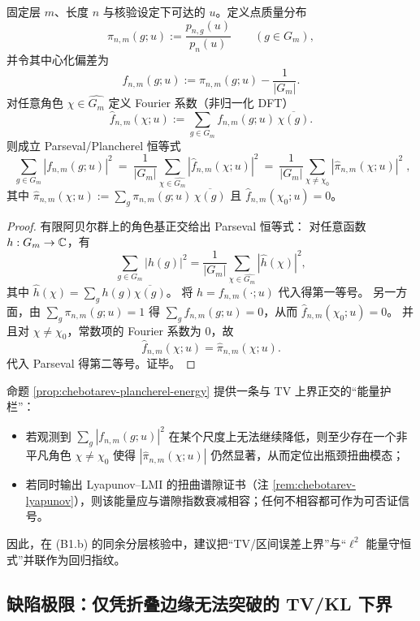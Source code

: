 \begin{proposition}\label{prop:chebotarev-plancherel-energy}
固定层 \(m\)、长度 \(n\) 与核验设定下可达的 \(u\)。定义点质量分布
$$
\pi_{n,m}(g;u):=\frac{p_{n,g}(u)}{p_n(u)}\qquad(g\in G_m),
$$
并令其中心化偏差为
$$
f_{n,m}(g;u):=\pi_{n,m}(g;u)-\frac{1}{|G_m|}.
$$
对任意角色 \(\chi\in\widehat{G_m}\) 定义 Fourier 系数（非归一化 DFT）
$$
\widehat f_{n,m}(\chi;u):=\sum_{g\in G_m} f_{n,m}(g;u)\,\overline{\chi(g)}.
$$
则成立 Parseval/Plancherel 恒等式
$$
\boxed{\;
\sum_{g\in G_m}\left|f_{n,m}(g;u)\right|^2
\ =\ 
\frac{1}{|G_m|}\sum_{\chi\in\widehat{G_m}}\left|\widehat f_{n,m}(\chi;u)\right|^2
\ =\ 
\frac{1}{|G_m|}\sum_{\chi\neq\chi_0}\left|\widehat \pi_{n,m}(\chi;u)\right|^2\; },
$$
其中 \(\widehat \pi_{n,m}(\chi;u):=\sum_{g}\pi_{n,m}(g;u)\,\overline{\chi(g)}\) 且 \(\widehat f_{n,m}(\chi_0;u)=0\)。
\end{proposition}
\begin{proof}
有限阿贝尔群上的角色基正交给出 Parseval 恒等式：
对任意函数 \(h:G_m\to\mathbb{C}\)，有
$$
\sum_{g\in G_m}|h(g)|^2=\frac{1}{|G_m|}\sum_{\chi\in\widehat{G_m}}|\widehat h(\chi)|^2,
$$
其中 \(\widehat h(\chi)=\sum_{g}h(g)\overline{\chi(g)}\)。
将 \(h=f_{n,m}(\cdot;u)\) 代入得第一等号。
另一方面，由 \(\sum_g\pi_{n,m}(g;u)=1\) 得 \(\sum_g f_{n,m}(g;u)=0\)，从而 \(\widehat f_{n,m}(\chi_0;u)=0\)。
并且对 \(\chi\neq\chi_0\)，常数项的 Fourier 系数为 \(0\)，故
$$
\widehat f_{n,m}(\chi;u)=\widehat \pi_{n,m}(\chi;u).
$$
代入 Parseval 得第二等号。证毕。
\end{proof}

\begin{remark}\label{rem:chebotarev-plancherel-use}
命题 \ref{prop:chebotarev-plancherel-energy} 提供一条与 TV 上界正交的“能量护栏”：
\begin{itemize}
  \item 若观测到 \(\sum_g|f_{n,m}(g;u)|^2\) 在某个尺度上无法继续降低，则至少存在一个非平凡角色 \(\chi\neq\chi_0\) 使得 \(|\widehat \pi_{n,m}(\chi;u)|\) 仍然显著，从而定位出瓶颈扭曲模态；
  \item 若同时输出 Lyapunov--LMI 的扭曲谱隙证书（注 \ref{rem:chebotarev-lyapunov}），则该能量应与谱隙指数衰减相容；任何不相容都可作为可否证信号。
\end{itemize}
因此，在 (B1.b) 的同余分层核验中，建议把“TV/区间误差上界”与“\(\ell^2\) 能量守恒式”并联作为回归指纹。
\end{remark}

\subsection{缺陷极限：仅凭折叠边缘无法突破的 TV/KL 下界}\label{subsec:defect-limit}

